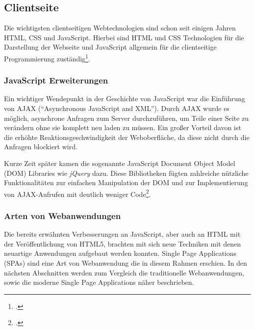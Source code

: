\subsection{Clientseite}
Die wichtigsten clientseitigen Webtechnologien sind schon seit einigen Jahren HTML, CSS und JavaScript. Hierbei sind HTML und CSS Technologien für die Darstellung der Webseite und JavaScript allgemein für die clientseitige Programmierung zuständig\footcite[Vgl.][]{Thattil2016}. 

\subsubsection{JavaScript Erweiterungen}
Ein wichtiger Wendepunkt in der Geschichte von JavaScript war die Einführung von \acs{AJAX} (\enquote{Asynchronous JavaScript and XML}). Durch AJAX wurde es möglich, asynchrone Anfragen zum Server durchzuführen, um Teile einer Seite zu verändern ohne sie komplett neu laden zu müssen. Ein großer Vorteil davon ist die erhöhte Reaktionsgeschwindigkeit der Weboberfläche, da diese nicht durch die Anfragen blockiert wird.

Kurze Zeit später kamen die sogenannte JavaScript Document Object Model (\acs{DOM}) Libraries wie \textit{jQuery} dazu. Diese Bibliotheken fügten zahlreiche nützliche Funktionalitäten zur einfachen Manipulation der DOM und zur Implementierung von AJAX-Aufrufen mit deutlich weniger Code\footcite[Vgl.][S. 4]{Fink2014}.

\subsubsection{Arten von Webanwendungen}
Die bereits erwähnten Verbesserungen an JavaScript, aber auch an HTML mit der Veröffentlichung von HTML5, brachten mit sich neue Techniken mit denen neuartige Anwendungen aufgebaut werden konnten. Single Page Applications (\acs{SPA}s) sind eine Art von Webanwendung die in diesem Rahmen erschien. In den nächsten Abschnitten werden zum Vergleich die traditionelle Webanwendungen, sowie die moderne Single Page Applications näher beschrieben.






